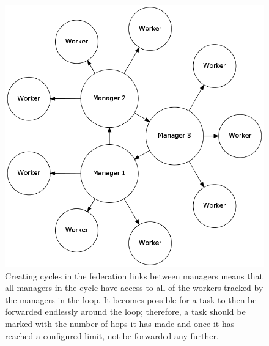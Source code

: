 \begin{figure}
\begin{center}
\includegraphics[width=.5\columnwidth]{figures/federated_loop}
\end{center}
\label{fig:Federated-Loop}
\caption{Creating cycles in the federation links between managers means that all managers in the
cycle have access to all of the workers tracked by the managers in the loop. It becomes possible
for a task to then be forwarded endlessly around the loop; therefore, a task should be marked with
the number of hops it has made and once it has reached a configured limit, not be forwarded any
further.}
\end{figure}

